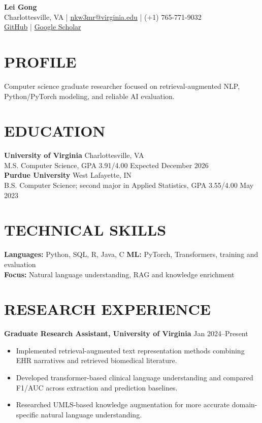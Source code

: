 \documentclass[10pt, letterpaper]{article}
\begin{document}
\setlength{\parindent}{0pt}
\begin{center}
{\fontsize{23}{25}\selectfont\textbf{Lei Gong}}\\[3pt]
Charlottesville, VA \quad | \quad \href{mailto:nkw3mr@virginia.edu}{nkw3mr@virginia.edu} \quad | \quad (+1) 765-771-9032\\[2pt]
\href{https://github.com/LeiGong0125Carrot}{GitHub} \quad | \quad \href{https://scholar.google.com/citations?user=8QLAkKMAAAAJ}{Google Scholar}
\end{center}
\vspace{-3mm}
\section{PROFILE}
Computer science graduate researcher focused on retrieval-augmented NLP, Python/PyTorch modeling, and reliable AI evaluation.
\section{EDUCATION}
\textbf{University of Virginia} \hfill Charlottesville, VA \\
M.S. Computer Science, GPA 3.91/4.00 \hfill Expected December 2026\\[1pt]
\textbf{Purdue University} \hfill West Lafayette, IN \\
B.S. Computer Science; second major in Applied Statistics, GPA 3.55/4.00 \hfill May 2023
\section{TECHNICAL SKILLS}
\textbf{Languages:} Python, SQL, R, Java, C \quad \textbf{ML:} PyTorch, Transformers, training and evaluation\\
\textbf{Focus:} Natural language understanding, RAG and knowledge enrichment
\section{RESEARCH EXPERIENCE}
\textbf{Graduate Research Assistant, University of Virginia} \hfill Jan 2024--Present
\begin{itemize}
\item Implemented retrieval-augmented text representation methods combining EHR narratives and retrieved biomedical literature.
\item Developed transformer-based clinical language understanding and compared F1/AUC across extraction and prediction baselines.
\item Researched UMLS-based knowledge augmentation for more accurate domain-specific natural language understanding.
\end{itemize}
\end{document}
